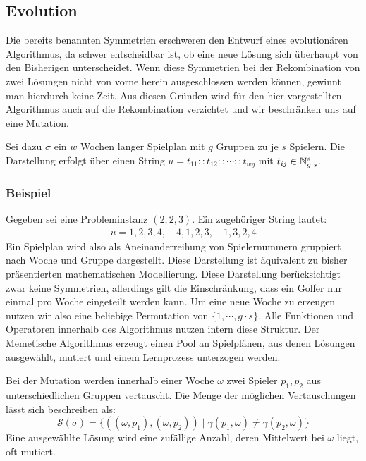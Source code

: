\subsection{Evolution}
Die bereits benannten Symmetrien erschweren den Entwurf eines evolutionären Algorithmus, da schwer entscheidbar ist, ob eine neue Lösung sich überhaupt von den Bisherigen
unterscheidet.
Wenn diese Symmetrien bei der Rekombination von zwei Lösungen nicht von vorne herein ausgeschlossen werden können, gewinnt man hierdurch keine Zeit. 
Aus diesen Gründen wird für den hier vorgestellten Algorithmus auch auf die Rekombination verzichtet und wir beschränken uns auf eine Mutation. 

Sei dazu $\sigma$ ein $w$ Wochen langer Spielplan mit $g$ Gruppen zu je $s$ Spielern. Die Darstellung erfolgt über einen String\label{Lösungsstring} $u = t_{11} :: t_{12} :: \cdots :: t_{wg}$ mit $t_{ij} \in \mathbb{N}_{g \cdot s}^s$.

\subsubsection{Beispiel}
Gegeben sei eine Probleminstanz $(2, 2, 3)$. Ein zugehöriger String lautet:
\begin{equation}
\begin{split} 
  u = 1, 2, 3, 4,\quad 4, 1, 2, 3,\quad 1, 3, 2, 4
\end{split}
\end{equation}
Ein Spielplan wird also als Aneinanderreihung von Spielernummern gruppiert nach Woche und Gruppe dargestellt. Diese Darstellung ist äquivalent zu bisher präsentierten mathematischen Modellierung.
Diese Darstellung berücksichtigt zwar keine Symmetrien, allerdings gilt die Einschränkung, dass ein Golfer nur einmal pro Woche eingeteilt werden kann. 
Um eine neue Woche zu erzeugen nutzen wir also eine beliebige Permutation von $\{ 1, \cdots, g \cdot s\}$. Alle Funktionen und Operatoren innerhalb des Algorithmus nutzen intern diese Struktur. 
Der Memetische Algorithmus erzeugt einen Pool an Spielplänen, aus denen Lösungen ausgewählt, mutiert und einem Lernprozess unterzogen werden.

Bei der Mutation werden innerhalb einer Woche $\omega$ zwei Spieler $p_1, p_2$ aus unterschiedlichen Gruppen vertauscht. Die Menge der möglichen Vertauschungen lässt sich beschreiben als:
\begin{equation}
  \mathcal{S}(\sigma) = \{ ((\omega, p_1), (\omega, p_2)) \;|\; \gamma(p_1, \omega) \neq \gamma(p_2, \omega) \}
\end{equation}
Eine ausgewählte Lösung wird eine zufällige Anzahl, deren Mittelwert bei $\omega$ liegt, oft mutiert.

